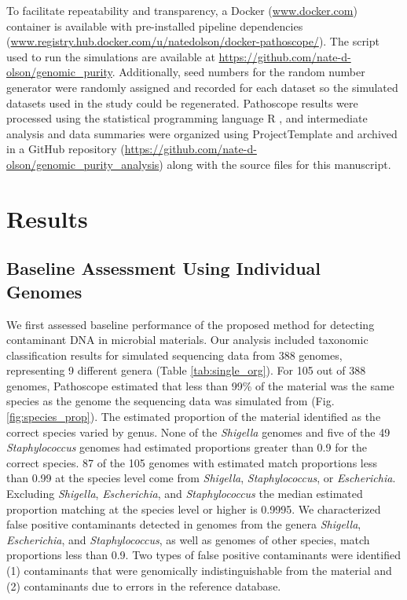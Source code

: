 \documentclass[fleqn,10pt,lineno]{wlpeerj}\usepackage[]{graphicx}\usepackage[]{color}
\begin{document}

To facilitate repeatability and transparency, a Docker (\url{www.docker.com}) container is available 
with pre-installed pipeline dependencies (\url{www.registry.hub.docker.com/u/natedolson/docker-pathoscope/}). 
The script used to run the simulations are available at \url{https://github.com/nate-d-olson/genomic_purity}.
Additionally, seed numbers for the random number generator were randomly assigned and recorded for each dataset so the simulated datasets used in the study could be regenerated.
Pathoscope results were processed using the statistical programming language R \citep{R}, and intermediate analysis and data summaries were organized using ProjectTemplate \citep{ProjectTemplate} and archived in a GitHub repository (\url{https://github.com/nate-d-olson/genomic_purity_analysis}) along with the source files for this manuscript.

\section*{Results}

\subsection*{Baseline Assessment Using Individual Genomes}


We first assessed baseline performance of the proposed method for detecting contaminant DNA in microbial materials. 
Our analysis included taxonomic classification results for simulated sequencing data  from 388 genomes, representing 9 different genera (Table \ref{tab:single_org}). 
For 105 out of 388 genomes, Pathoscope estimated that less than 99\% of the material was the same species as the genome the sequencing data was simulated from (Fig. \ref{fig:species_prop}). 
The estimated proportion of the material identified as the correct species varied by genus. 
None of the \textit{Shigella} genomes and five of the 49 \textit{Staphylococcus} genomes had estimated proportions greater than 0.9 for the correct species. 
87 of the 105 genomes with estimated match proportions less than 0.99 at the species level come from \textit{Shigella}, \textit{Staphylococcus}, or \textit{Escherichia}. 
Excluding \textit{Shigella}, \textit{Escherichia}, and \textit{Staphylococcus} the median estimated proportion matching at the species level or higher is  0.9995. 
We characterized false positive contaminants detected in genomes from the genera \textit{Shigella}, \textit{Escherichia}, and \textit{Staphylococcus}, as well as genomes of other species, match proportions less than 0.9. 
Two types of false positive contaminants were identified (1) contaminants that were genomically indistinguishable from the material and (2) contaminants due to errors in the reference database.
\end{document}
